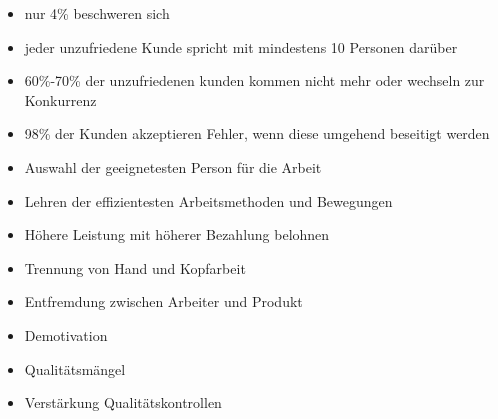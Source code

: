 \documentclass[12pt]{article}
\begin{document}
\begin{note}

\end{note}

\begin{note}

    \begin{field}
        \begin{itemize}
            \item nur 4\% beschweren sich
            \item jeder unzufriedene Kunde spricht mit mindestens 10 Personen darüber
            \item 60\%-70\% der unzufriedenen kunden kommen nicht mehr oder wechseln zur Konkurrenz
            \item 98\% der Kunden akzeptieren Fehler, wenn diese umgehend beseitigt werden
        \end{itemize}
    \end{field}
\end{note}

\begin{note}
\end{note}



\begin{note}

    \begin{field}
        \begin{itemize}
            \item Auswahl der geeignetesten Person für die Arbeit

            \item Lehren der effizientesten Arbeitsmethoden und Bewegungen

            \item Höhere Leistung mit höherer Bezahlung belohnen
        \end{itemize}
    \end{field}
\end{note}

\begin{note}

    \begin{field}
        \begin{itemize}
            \item Trennung von Hand und Kopfarbeit
            \item Entfremdung zwischen Arbeiter und Produkt
            \item Demotivation
            \item Qualitätsmängel
            \item Verstärkung Qualitätskontrollen
        \end{itemize}
    \end{field}
\end{note}
\end{document}
